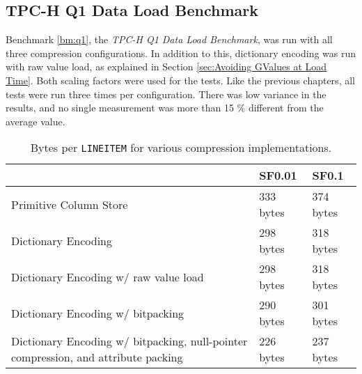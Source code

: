 \subsection{TPC-H Q1 Data Load Benchmark}
Benchmark \ref{bm:q1}, the \textit{TPC-H Q1 Data Load Benchmark}, was run with all three compression configurations. In addition to this, dictionary encoding was run with raw value load, as explained in Section \ref{sec:Avoiding GValues at Load Time}. Both scaling factors were used for the tests. Like the previous chapters, all tests were run three times per configuration. There was low variance in the results, and no single measurement was more than 15 \% different from the average value.
\begin{table}
    \centering
    \begin{tabularx}{\textwidth}{X | X X}
        & SF0.01 & SF0.1 \\ 
        \hline
        \hline
        Primitive Column Store & 333 bytes & 374 bytes \\
        Dictionary Encoding & 298 bytes & 318 bytes \\
        Dictionary Encoding w/ raw value load & 298 bytes & 318 bytes \\
        Dictionary Encoding w/ bitpacking & 290 bytes & 301 bytes \\
        Dictionary Encoding w/ bitpacking, null-pointer compression, and attribute packing & 226 bytes & 237 bytes \\
    \end{tabularx}
    \caption{Bytes per \texttt{LINEITEM} for various compression implementations.} 
    \label{tab:dict-bpl}
\end{table}

